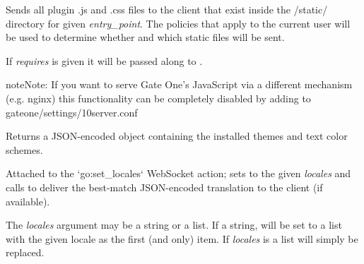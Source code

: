\documentclass[letterpaper,10pt,openany]{sphinxmanual}
\begin{document}
\begin{fulllineitems}

\begin{fulllineitems}
\label{Developer/server:gateone.core.server.ApplicationWebSocket.send_plugin_static_files}
Sends all plugin .js and .css files to the client that exist inside the
/static/ directory for given \emph{entry\_point}.  The policies that apply to
the current user will be used to determine whether and which static
files will be sent.

If \emph{requires} is given it will be passed along to .

\begin{notice}{note}{Note:}
If you want to serve Gate One's JavaScript via a different mechanism
(e.g. nginx) this functionality can be completely disabled by adding
 to gateone/settings/10server.conf
\end{notice}

\end{fulllineitems}


\begin{fulllineitems}
\label{Developer/server:gateone.core.server.ApplicationWebSocket.enumerate_themes}
Returns a JSON-encoded object containing the installed themes and text
color schemes.

\end{fulllineitems}


\begin{fulllineitems}
\label{Developer/server:gateone.core.server.ApplicationWebSocket.set_locales}
Attached to the `go:set\_locales{}` WebSocket action; sets
 to the given \emph{locales} and calls
{\hyperref[Developer/server:gateone.core.server.ApplicationWebSocket.send_js_translation]{}} to deliver the best-match
JSON-encoded translation to the client (if available).

The \emph{locales} argument may be a string or a list.  If a string,
 will be set to a list with the given locale as the
first (and only) item.  If \emph{locales} is a list 
will simply be replaced.


\end{fulllineitems}
\end{fulllineitems}
\end{document}
